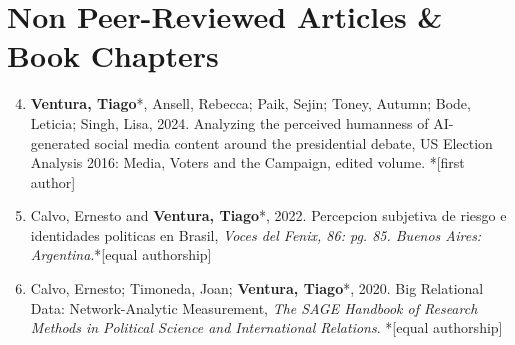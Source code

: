 \documentclass[letterpaper, 11pt]{article}
\newenvironment{benumerate}[1]{
    \let\oldItem\item
    \def\item{\addtocounter{enumi}{-2}\oldItem}
    \begin{enumerate}[leftmargin=2em]
    \setcounter{enumi}{#1}
    \addtocounter{enumi}{1}
}{
    \end{enumerate}
}
\begin{document}
\section*{Non Peer-Reviewed Articles \& Book Chapters}

    \begin{benumerate}{3}

    \item \textbf{Ventura, Tiago}*, Ansell, Rebecca; Paik, Sejin; Toney, Autumn; Bode, Leticia; Singh, Lisa, 2024. Analyzing the perceived humanness of AI-generated social media content around the presidential debate, US Election Analysis 2016: Media, Voters and the Campaign, edited volume. *[first author]


    \item   Calvo, Ernesto and \textbf{Ventura, Tiago}*, 2022. Percepcion subjetiva de riesgo e identidades politicas en Brasil, \textit{Voces del Fenix, 86: pg. 85. Buenos Aires: Argentina}.*[equal authorship]

    \item  Calvo, Ernesto; Timoneda, Joan; \textbf{Ventura, Tiago}*, 2020. Big Relational Data: Network-Analytic Measurement, \textit{The SAGE Handbook of Research Methods in Political Science and International Relations}. *[equal authorship]

    \end{benumerate}






\end{document}
